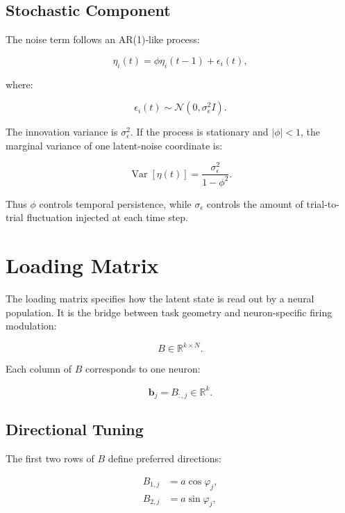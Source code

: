 \documentclass[11pt]{article}
\begin{document}
\subsection{Stochastic Component}

The noise term follows an AR(1)-like process:

\begin{equation}
\eta_i(t) = \phi \eta_i(t-1) + \epsilon_i(t),
\end{equation}

where:

\begin{equation}
\epsilon_i(t) \sim \mathcal{N}(0, \sigma_\epsilon^2 I).
\end{equation}

The innovation variance is $\sigma_\epsilon^2$. If the process is stationary
and $|\phi|<1$, the marginal variance of one latent-noise coordinate is:

\begin{equation}
\operatorname{Var}[\eta(t)] =
\frac{\sigma_\epsilon^2}{1-\phi^2}.
\end{equation}

Thus $\phi$ controls temporal persistence, while $\sigma_\epsilon$ controls the
amount of trial-to-trial fluctuation injected at each time step.

\section{Loading Matrix}

The loading matrix specifies how the latent state is read out by a neural
population. It is the bridge between task geometry and neuron-specific firing
modulation:

\begin{equation}
B \in \mathbb{R}^{k \times N}.
\end{equation}

Each column of $B$ corresponds to one neuron:

\begin{equation}
\bm{b}_j = B_{:,j} \in \mathbb{R}^{k}.
\end{equation}

\subsection{Directional Tuning}

The first two rows of $B$ define preferred directions:

\begin{align}
B_{1,j} &= a \cos \varphi_j,\\
B_{2,j} &= a \sin \varphi_j,
\end{align}
\end{document}
